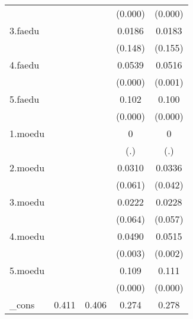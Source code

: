 {\begin{tabular}{l*{4}{c}}
            &                     &                     &     (0.000)         &     (0.000)         \\
[1em]
3.faedu     &                     &                     &      0.0186         &      0.0183         \\
            &                     &                     &     (0.148)         &     (0.155)         \\
[1em]
4.faedu     &                     &                     &      0.0539\sym{***}&      0.0516\sym{***}\\
            &                     &                     &     (0.000)         &     (0.001)         \\
[1em]
5.faedu     &                     &                     &       0.102\sym{***}&       0.100\sym{***}\\
            &                     &                     &     (0.000)         &     (0.000)         \\
[1em]
1.moedu     &                     &                     &           0         &           0         \\
            &                     &                     &         (.)         &         (.)         \\
[1em]
2.moedu     &                     &                     &      0.0310         &      0.0336\sym{*}  \\
            &                     &                     &     (0.061)         &     (0.042)         \\
[1em]
3.moedu     &                     &                     &      0.0222         &      0.0228         \\
            &                     &                     &     (0.064)         &     (0.057)         \\
[1em]
4.moedu     &                     &                     &      0.0490\sym{**} &      0.0515\sym{**} \\
            &                     &                     &     (0.003)         &     (0.002)         \\
[1em]
5.moedu     &                     &                     &       0.109\sym{***}&       0.111\sym{***}\\
            &                     &                     &     (0.000)         &     (0.000)         \\
[1em]
\_cons      &       0.411\sym{***}&       0.406\sym{***}&       0.274\sym{***}&       0.278\sym{***}\\

\end{tabular}}
